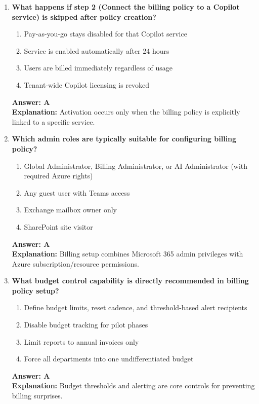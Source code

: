 \documentclass[10pt]{article}
\begin{document}
\begin{enumerate}[leftmargin=*]
\item \textbf{What happens if step 2 (Connect the billing policy to a Copilot service) is skipped after policy creation?}
\begin{enumerate}[label=\Alph*.]
  \item Pay-as-you-go stays disabled for that Copilot service
  \item Service is enabled automatically after 24 hours
  \item Users are billed immediately regardless of usage
  \item Tenant-wide Copilot licensing is revoked
\end{enumerate}
\textbf{Answer: A}\\
\textbf{Explanation:} Activation occurs only when the billing policy is explicitly linked to a specific service.

\item \textbf{Which admin roles are typically suitable for configuring billing policy?}
\begin{enumerate}[label=\Alph*.]
  \item Global Administrator, Billing Administrator, or AI Administrator (with required Azure rights)
  \item Any guest user with Teams access
  \item Exchange mailbox owner only
  \item SharePoint site visitor
\end{enumerate}
\textbf{Answer: A}\\
\textbf{Explanation:} Billing setup combines Microsoft 365 admin privileges with Azure subscription/resource permissions.

\item \textbf{What budget control capability is directly recommended in billing policy setup?}
\begin{enumerate}[label=\Alph*.]
  \item Define budget limits, reset cadence, and threshold-based alert recipients
  \item Disable budget tracking for pilot phases
  \item Limit reports to annual invoices only
  \item Force all departments into one undifferentiated budget
\end{enumerate}
\textbf{Answer: A}\\
\textbf{Explanation:} Budget thresholds and alerting are core controls for preventing billing surprises.


\end{enumerate}
\end{document}
